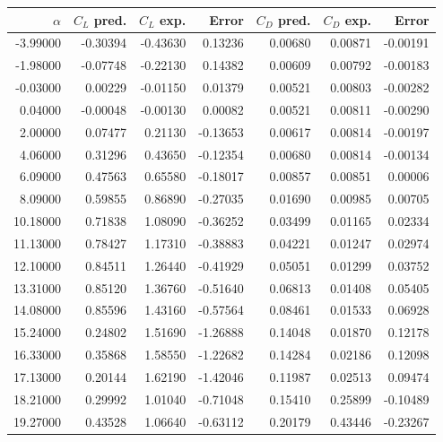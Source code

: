 \documentclass[10pt]{article}
\begin{document}
\begin{longtable}{rrrrrrr}\toprule $\alpha$ & $C_L$ pred. & $C_L$ exp. & Error & $C_D$ pred. & $C_D$ exp. & Error\\\midrule
-3.99000 & -0.30394 & -0.43630 & 0.13236 & 0.00680 & 0.00871 & -0.00191\\
-1.98000 & -0.07748 & -0.22130 & 0.14382 & 0.00609 & 0.00792 & -0.00183\\
-0.03000 & 0.00229 & -0.01150 & 0.01379 & 0.00521 & 0.00803 & -0.00282\\
0.04000 & -0.00048 & -0.00130 & 0.00082 & 0.00521 & 0.00811 & -0.00290\\
2.00000 & 0.07477 & 0.21130 & -0.13653 & 0.00617 & 0.00814 & -0.00197\\
4.06000 & 0.31296 & 0.43650 & -0.12354 & 0.00680 & 0.00814 & -0.00134\\
6.09000 & 0.47563 & 0.65580 & -0.18017 & 0.00857 & 0.00851 & 0.00006\\
8.09000 & 0.59855 & 0.86890 & -0.27035 & 0.01690 & 0.00985 & 0.00705\\
10.18000 & 0.71838 & 1.08090 & -0.36252 & 0.03499 & 0.01165 & 0.02334\\
11.13000 & 0.78427 & 1.17310 & -0.38883 & 0.04221 & 0.01247 & 0.02974\\
12.10000 & 0.84511 & 1.26440 & -0.41929 & 0.05051 & 0.01299 & 0.03752\\
13.31000 & 0.85120 & 1.36760 & -0.51640 & 0.06813 & 0.01408 & 0.05405\\
14.08000 & 0.85596 & 1.43160 & -0.57564 & 0.08461 & 0.01533 & 0.06928\\
15.24000 & 0.24802 & 1.51690 & -1.26888 & 0.14048 & 0.01870 & 0.12178\\
16.33000 & 0.35868 & 1.58550 & -1.22682 & 0.14284 & 0.02186 & 0.12098\\
17.13000 & 0.20144 & 1.62190 & -1.42046 & 0.11987 & 0.02513 & 0.09474\\
18.21000 & 0.29992 & 1.01040 & -0.71048 & 0.15410 & 0.25899 & -0.10489\\
19.27000 & 0.43528 & 1.06640 & -0.63112 & 0.20179 & 0.43446 & -0.23267\\
\bottomrule\end{longtable}
\end{document}
